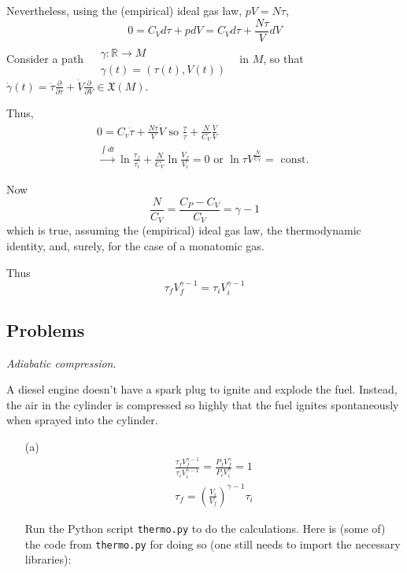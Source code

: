 \documentclass[10pt]{amsart}
\newcommand{\problemhead}[1]
  {
   \noindent{\small\bf Problem #1.}
   }
\begin{document}
\begin{multicols*}{2}
Nevertheless, using the (empirical) ideal gas law, $pV = N\tau$, 
\[
0 = C_V d\tau + pdV = C_V d\tau + \frac{N\tau}{V} dV
\]
Consider a path $\begin{aligned} & \quad \\
  & \gamma : \mathbb{R} \to M \\ 
  & \gamma(t) = (\tau(t), V(t)) \end{aligned}$ \quad \, in $M$, so that $\dot{\gamma}(t) = \dot{\tau} \frac{ \partial }{ \partial \tau } + \dot{V} \frac{ \partial }{ \partial V} \in \mathfrak{X}(M)$.  

Thus, 
\[
\begin{gathered}
  0 = C_v \dot{\tau} + \frac{N \tau}{V} \dot{V} \text{ so } \frac{ \dot{\tau}}{\tau} + \frac{N}{C_V} \frac{ \dot{V}}{V} \\
  \xrightarrow{ \int dt } \ln{ \frac{ \tau_f}{ \tau_i } } + \frac{N}{C_V} \ln{ \frac{V_f}{ V_i } } = 0 \text{ or } \ln{\tau V^{\frac{N}{C_V}} } = \text{ const. }
\end{gathered}
\]

Now
\[
\frac{N}{C_V} = \frac{C_P - C_V}{ C_V} = \gamma -1 
\]
which is true, assuming the (empirical) ideal gas law, the thermodynamic identity, and, surely, for the case of a monatomic gas.  

Thus
\[
\tau_f V_f^{\gamma-1} = \tau_i V_i^{\gamma -1}
\]

\subsection*{Problems}

\problemhead{4} \emph{Adiabatic compression}. 

A diesel engine doesn't have a spark plug to ignite and explode the fuel.  Instead, the air in the cylinder is compressed so highly that the fuel ignites spontaneously when sprayed into the cylinder.  

\begin{enumerate}
\item[(a)] 
\[
\begin{gathered}
  \frac{ \tau_f V_f^{\gamma -1} }{ \tau_i V_i^{\gamma -1} } = \frac{ P_f V_f^{\gamma }}{ P_i V_i^{\gamma} } = 1 \\
  \tau_f = \left( \frac{V_i}{V_f} \right)^{\gamma -1 }\tau_i
\end{gathered}
\]

Run the Python script \verb|thermo.py| to do the calculations.  Here is (some of) the code from \verb|thermo.py| for doing so (one still needs to import the necessary libraries):


\end{enumerate}
\end{multicols*}
\end{document}
